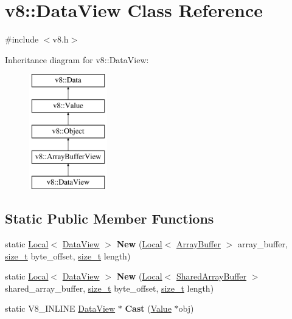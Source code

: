 \hypertarget{classv8_1_1DataView}{}\section{v8\+:\+:Data\+View Class Reference}
\label{classv8_1_1DataView}


{\ttfamily \#include $<$v8.\+h$>$}

Inheritance diagram for v8\+:\+:Data\+View\+:\begin{figure}[H]
\begin{center}
\leavevmode
\includegraphics[height=5.000000cm]{classv8_1_1DataView}
\end{center}
\end{figure}
\subsection*{Static Public Member Functions}
\begin{DoxyCompactItemize}
\item 
\mbox{\label{classv8_1_1DataView_af1853689574fdc56ae787b1113143fef}} 
static \mbox{\hyperlink{classv8_1_1Local}{Local}}$<$ \mbox{\hyperlink{classv8_1_1DataView}{Data\+View}} $>$ {\bfseries New} (\mbox{\hyperlink{classv8_1_1Local}{Local}}$<$ \mbox{\hyperlink{classv8_1_1ArrayBuffer}{Array\+Buffer}} $>$ array\+\_\+buffer, \mbox{\hyperlink{classsize__t}{size\+\_\+t}} byte\+\_\+offset, \mbox{\hyperlink{classsize__t}{size\+\_\+t}} length)
\item 
\mbox{\label{classv8_1_1DataView_aea9fa77f2e68e6c9dde0c9160e494d9c}} 
static \mbox{\hyperlink{classv8_1_1Local}{Local}}$<$ \mbox{\hyperlink{classv8_1_1DataView}{Data\+View}} $>$ {\bfseries New} (\mbox{\hyperlink{classv8_1_1Local}{Local}}$<$ \mbox{\hyperlink{classv8_1_1SharedArrayBuffer}{Shared\+Array\+Buffer}} $>$ shared\+\_\+array\+\_\+buffer, \mbox{\hyperlink{classsize__t}{size\+\_\+t}} byte\+\_\+offset, \mbox{\hyperlink{classsize__t}{size\+\_\+t}} length)
\item 
\mbox{\label{classv8_1_1DataView_aa97d15fcb28c6c002a52d32877c8fd3a}} 
static V8\+\_\+\+I\+N\+L\+I\+NE \mbox{\hyperlink{classv8_1_1DataView}{Data\+View}} $\ast$ {\bfseries Cast} (\mbox{\hyperlink{classv8_1_1Value}{Value}} $\ast$obj)
\end{DoxyCompactItemize}
